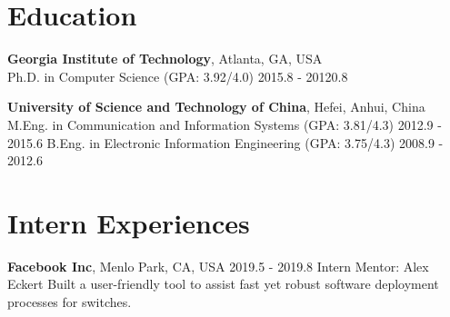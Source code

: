\documentclass[line,11pt,letter]{includes/cls/myRes}
\begin{document}

\address{779 Cascade Dr, CA 94087, United States}
\address{Cell: +1(404)697-0608. \hspace{5pt} Email: lgong2020@yahoo.com}

\begin{resume}


\vspace*{-10pt}
\vspace*{-10pt}
\negspace
\section{Education}
\vspace{-4pt}
{\setlength{\parskip}{0pt}
\textbf{Georgia Institute of Technology}, Atlanta, GA, USA\\
{\hspace*{1em} Ph.D. in Computer Science (GPA: 3.92/4.0) \hspace{52.5pt} \hfill 2015.8 - 20120.8 \break}
}
\sspace

{\setlength{\parskip}{0pt}
\textbf{University of Science and Technology of China}, Hefei, Anhui, China\\
{\hspace*{1em} M.Eng. in Communication and Information Systems (GPA: 3.81/4.3) \hspace{52.5pt} \hfill 2012.9 - 2015.6\break}
{\hspace*{1em} B.Eng. in Electronic Information Engineering (GPA: 3.75/4.3) \hspace{52.5pt} \hfill 2008.9 - 2012.6 \break}
}
\negspace
\section{Intern Experiences}
\vspace{-4pt}
{\setlength{\parskip}{0pt}
{\bf Facebook Inc}, Menlo Park, CA, USA \hfill 2019.5 - 2019.8\break
{\hspace*{1em} Intern \hfill Mentor: Alex Eckert\break}
{\hspace*{1em} Built a user-friendly tool to assist fast yet robust software deployment processes for switches.  \break}
}\sspace


\end{resume}
\end{document}
